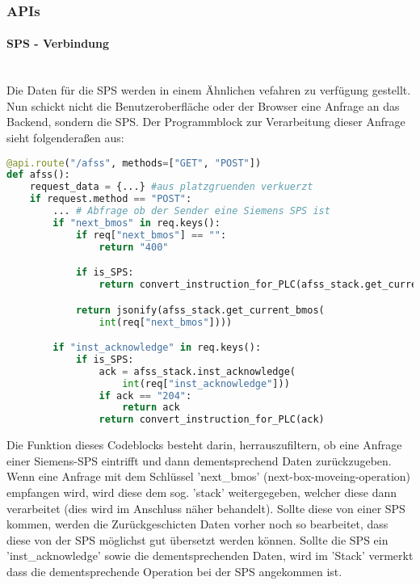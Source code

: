 \subsubsection{APIs}

\paragraph{SPS - Verbindung}\mbox{}\\
Die Daten für die SPS werden in einem Ähnlichen vefahren zu verfügung gestellt. Nun schickt nicht die Benutzeroberfläche oder der Browser eine Anfrage an das Backend, sondern die SPS. Der Programmblock zur Verarbeitung dieser Anfrage sieht folgenderaßen aus:

\begin{lstlisting}[language=Python]
@api.route("/afss", methods=["GET", "POST"])
def afss():   
    request_data = {...} #aus platzgruenden verkuerzt
    if request.method == "POST":
        ... # Abfrage ob der Sender eine Siemens SPS ist
        if "next_bmos" in req.keys():
            if req["next_bmos"] == "":
                return "400"

            if is_SPS:
                return convert_instruction_for_PLC(afss_stack.get_current_bmos(int(req["next_bmos"])))

            return jsonify(afss_stack.get_current_bmos(
                int(req["next_bmos"])))

        if "inst_acknowledge" in req.keys():
            if is_SPS:
                ack = afss_stack.inst_acknowledge(
                    int(req["inst_acknowledge"]))
                if ack == "204":
                    return ack
                return convert_instruction_for_PLC(ack)
\end{lstlisting}  

Die Funktion dieses Codeblocks besteht darin, herrauszufiltern, ob eine Anfrage einer Siemens-SPS eintrifft und dann dementsprechend Daten zurückzugeben.
Wenn eine Anfrage mit dem Schlüssel 'next\_bmos' (next-box-moveing-operation) empfangen wird, wird diese dem sog. 'stack' weitergegeben, welcher diese dann verarbeitet (dies wird im Anschluss näher behandelt). Sollte diese von einer SPS kommen, werden die Zurückgeschicten Daten vorher noch so bearbeitet, dass diese von der SPS möglichst gut übersetzt werden können.
Sollte die SPS ein 'inst\_acknowledge' sowie die dementsprechenden Daten, wird im 'Stack' vermerkt dass die dementsprechende Operation bei der SPS angekommen ist.

